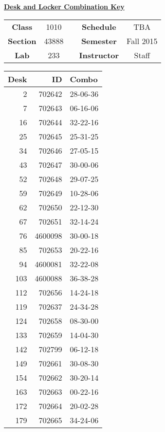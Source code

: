 \documentclass[12pt]{article}
\begin{document}
\thispagestyle{empty}

\begin{center}
	{\huge\textbf{\underline{ Desk and Locker Combination Key}}}
\end{center}


\begin{table}[h]
  \centering
  \begin{tabular}{ccccc}

  \textbf{Class} & 1010 & {\qquad} &\textbf{Schedule} & TBA \\
  \textbf{Section} & 43888 & {\qquad} & \textbf{Semester} & Fall 2015 \\
  \textbf{Lab} & 233 & {\qquad} & \textbf{Instructor} & Staff \\
  \end{tabular}
\end{table}
 \vspace{0.1in}
\begin{minipage}{0.4\textwidth}

\begin{tabular}{rrl}
\toprule
 Desk &       ID &     Combo \\
\midrule
    2 &   702642 &  28-06-36 \\
    7 &   702643 &  06-16-06 \\
   16 &   702644 &  32-22-16 \\
   25 &   702645 &  25-31-25 \\
   34 &   702646 &  27-05-15 \\
   43 &   702647 &  30-00-06 \\
   52 &   702648 &  29-07-25 \\
   59 &   702649 &  10-28-06 \\
   62 &   702650 &  22-12-30 \\
   67 &   702651 &  32-14-24 \\
   76 &  4600098 &  30-00-18 \\
   85 &   702653 &  20-22-16 \\
   94 &  4600081 &  32-22-08 \\
  103 &  4600088 &  36-38-28 \\
  112 &   702656 &  14-24-18 \\
  119 &   702637 &  24-34-28 \\
  124 &   702658 &  08-30-00 \\
  133 &   702659 &  14-04-30 \\
  142 &   702799 &  06-12-18 \\
  149 &   702661 &  30-08-30 \\
  154 &   702662 &  30-20-14 \\
  163 &   702663 &  00-22-16 \\
  172 &   702664 &  20-02-28 \\
  179 &   702665 &  34-24-06 \\
\bottomrule
\end{tabular}


\end{minipage}
\end{document}
